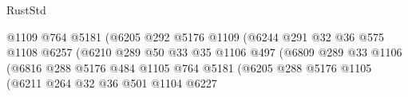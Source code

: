 \begin{lexlean}{RustStd}
\begin{coremodule}
                                                @1109
                                                @764
                                                @5181
                                                (@6205
                                                  @292
                                                  @5176
                                                  @1109
                                                  (@6244
                                                    @291
                                                    @32
                                                    @36
                                                    @575
                                                    @1108
                                                    @6257
                                                    (@6210
                                                      @289
                                                      @50
                                                      @33
                                                      @35
                                                      @1106
                                                      @497
                                                      (@6809
                                                        @289
                                                        @33
                                                        @1106
                                                        (@6816
                                                          @288
                                                          @5176
                                                          @484
                                                          @1105
                                                          @764
                                                          @5181
                                                          (@6205
                                                            @288
                                                            @5176
                                                            @1105
                                                            (@6211
                                                              @264
                                                              @32
                                                              @36
                                                              @501
                                                              @1104
                                                              @6227

\end{coremodule}
\end{lexlean}
